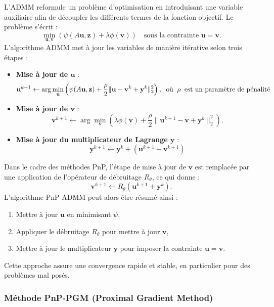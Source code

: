 \documentclass[a4paper, 12pt]{report} %
\begin{document}
L’ADMM reformule un problème d’optimisation en introduisant une variable auxiliaire afin de découpler les différents termes de la fonction objectif. Le problème s’écrit :
\[
\min_{\mathbf{u}, \mathbf{v}} \left( \psi(A\mathbf{u}, \mathbf{z}) + \lambda \phi(\mathbf{v}) \right) \quad \text{sous la contrainte } \mathbf{u} = \mathbf{v}.
\]
L’algorithme ADMM met à jour les variables de manière itérative selon trois étapes :

\begin{itemize}
    \item \textbf{Mise à jour de \( \mathbf{u} \)} :
    \[
    \mathbf{u}^{k+1} \leftarrow \arg\min_{\mathbf{u}} \left( \psi(A\mathbf{u}, \mathbf{z}) + \frac{\rho}{2} \| \mathbf{u} - \mathbf{v}^k + \mathbf{y}^k \|_2^2 \right), \hspace{0.2 cm} \text{où} \hspace{0.2 cm}  \rho \hspace{0.2 cm} \text{est un paramètre de pénalité}
    \]
    \item \textbf{Mise à jour de \( \mathbf{v} \)} :
    \[
    \mathbf{v}^{k+1} \leftarrow \arg\min_{\mathbf{v}} \left( \lambda \phi(\mathbf{v}) + \frac{\rho}{2} \| \mathbf{u}^{k+1} - \mathbf{v} + \mathbf{y}^k \|_2^2 \right).
    \]
    \item \textbf{Mise à jour du multiplicateur de Lagrange \( \mathbf{y} \)} :
    \[
    \mathbf{y}^{k+1} \leftarrow \mathbf{y}^k + (\mathbf{u}^{k+1} - \mathbf{v}^{k+1})
    \]
\end{itemize}
Dans le cadre des méthodes PnP, l’étape de mise à jour de \( \mathbf{v} \) est remplacée par une application de l’opérateur de débruitage \( R_\theta \), ce qui donne :
\[
\mathbf{v}^{k+1} \leftarrow R_\theta(\mathbf{u}^{k+1} + \mathbf{y}^k).
\]
L’algorithme PnP-ADMM peut alors être résumé ainsi :
\begin{enumerate}
    \item Mettre à jour \( \mathbf{u} \) en minimisant \( \psi \),
    \item Appliquer le débruitage \( R_\theta \) pour mettre à jour \( \mathbf{v} \),
    \item Mettre à jour le multiplicateur \( \mathbf{y} \) pour imposer la contrainte \( \mathbf{u} = \mathbf{v} \).
\end{enumerate}

Cette approche assure une convergence rapide et stable, en particulier pour des problèmes mal posés.

\subsubsection{Méthode PnP-PGM (Proximal Gradient Method)}
\end{document}
